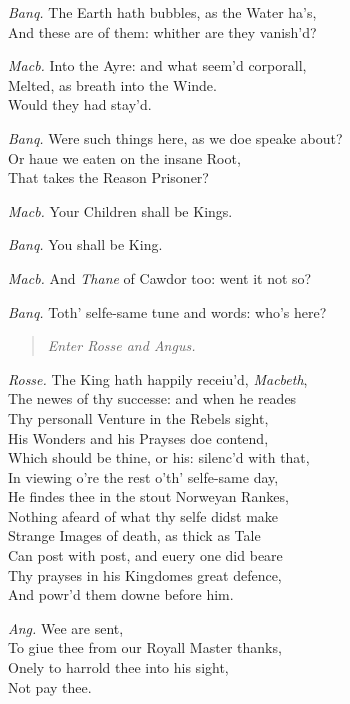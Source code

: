 \documentclass[12pt]{sides}
\newcommand{\StageDir}[1]{\begin{quote}\centering\em #1\end{quote}}
\newcommand{\dia}[1]{\hskip 15pt\textit{#1}\hskip 6pt}
\begin{document}
\begin{multicols}{2}
            \dia{Banq.} The Earth hath bubbles, as the Water ha's, \\ And these are of them: whither are they vanish'd?
            
            \dia{Macb.} Into the Ayre: and what seem'd corporall, \\ Melted, as breath into the Winde. \\ Would they had stay'd.

            \dia{Banq.} Were such things here, as we doe speake about? \\ Or haue we eaten on the insane Root, \\ That takes the Reason Prisoner?
            
            \dia{Macb.} Your Children shall be Kings.
            
            \dia{Banq.} You shall be King.
            
            \dia{Macb.} And \textit{Thane} of Cawdor too: went it not so?

            \dia{Banq.} Toth' selfe-same tune and words: who's here?

            \StageDir{Enter Rosse and Angus.}

            \dia{Rosse.} The King hath happily receiu'd, \textit{Macbeth}, \\ The newes of thy successe: and when he reades \\ Thy personall Venture in the Rebels sight, \\ His Wonders and his Prayses doe contend, \\ Which should be thine, or his: silenc'd with that, \\ In viewing o're the rest o'th' selfe-same day, \\ He findes thee in the stout Norweyan Rankes, \\ Nothing afeard of what thy selfe didst make \\ Strange Images of death, as thick as Tale \\ Can post with post, and euery one did beare \\ Thy prayses in his Kingdomes great defence, \\ And powr'd them downe before him.

            \dia{Ang.} Wee are sent, \\ To giue thee from our Royall Master thanks, \\ Onely to harrold thee into his sight, \\ Not pay thee.


\end{multicols}
\end{document}
